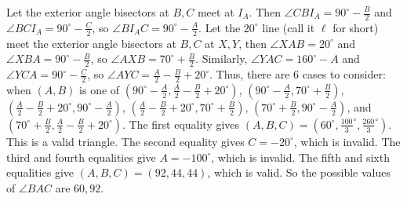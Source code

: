 Let the exterior angle bisectors at $B,C$ meet at $I_A$. Then $\angle{CBI_A}=90^\circ-\frac{B}{2}$ and $\angle{BCI_A}=90^\circ-\frac{C}{2}$, so $\angle{BI_AC}=90^\circ-\frac{A}{2}$. Let the $20^\circ$ line (call it $\ell$ for short) meet the exterior angle bisectors at $B,C$ at $X,Y$, then $\angle{XAB}=20^\circ$ and $\angle{XBA}=90^\circ-\frac{B}{2}$, so $\angle{AXB}=70^\circ+\frac{B}{2}$. Similarly, $\angle{YAC}=160^\circ-A$ and $\angle{YCA}=90^\circ-\frac{C}{2}$, so $\angle{AYC}=\frac{A}{2}-\frac{B}{2}+20^\circ$. Thus, there are $6$ cases to consider: when $\left(A,B\right)$ is one of $\left(90^\circ-\frac{A}{2},\frac{A}{2}-\frac{B}{2}+20^\circ\right)$, $\left(90^\circ-\frac{A}{2},70^\circ+\frac{B}{2}\right)$, $\left(\frac{A}{2}-\frac{B}{2}+20^\circ,90^\circ-\frac{A}{2}\right)$, $\left(\frac{A}{2}-\frac{B}{2}+20^\circ,70^\circ+\frac{B}{2}\right)$, $\left(70^\circ+\frac{B}{2},90^\circ-\frac{A}{2}\right)$, and $\left(70^\circ+\frac{B}{2},\frac{A}{2}-\frac{B}{2}+20^\circ\right)$. The first equality gives $\left(A,B,C\right)=\left(60^\circ,\frac{100}{3}^\circ,\frac{260}{3}^\circ\right)$. This is a valid triangle. The second equality gives $C=-20^\circ$, which is invalid. The third and fourth equalities give $A=-100^\circ$, which is invalid. The fifth and sixth equalities give $\left(A,B,C\right)=\left(92,44,44\right)$, which is valid. So the possible values of $\angle{BAC}$ are $\boxed{60,92}$.